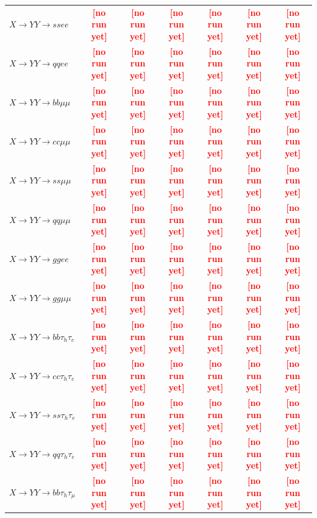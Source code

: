 \documentclass[12pt]{article}   %
\newcommand{\pending}[1]{\textcolor{red}{\textbf{[#1]}}}
\begin{document}
\begin{landscape}
{\begin{longtable}{@{\extracolsep{\fill}}lcccccc@{}}
$X\to YY\to ssee$ & \pending{no run yet} & \pending{no run yet} & \pending{no run yet} & \pending{no run yet} & \pending{no run yet} & \pending{no run yet} \\
$X\to YY\to qqee$ & \pending{no run yet} & \pending{no run yet} & \pending{no run yet} & \pending{no run yet} & \pending{no run yet} & \pending{no run yet} \\
$X\to YY\to bb\mu\mu$ & \pending{no run yet} & \pending{no run yet} & \pending{no run yet} & \pending{no run yet} & \pending{no run yet} & \pending{no run yet} \\
$X\to YY\to cc\mu\mu$ & \pending{no run yet} & \pending{no run yet} & \pending{no run yet} & \pending{no run yet} & \pending{no run yet} & \pending{no run yet} \\
$X\to YY\to ss\mu\mu$ & \pending{no run yet} & \pending{no run yet} & \pending{no run yet} & \pending{no run yet} & \pending{no run yet} & \pending{no run yet} \\
$X\to YY\to qq\mu\mu$ & \pending{no run yet} & \pending{no run yet} & \pending{no run yet} & \pending{no run yet} & \pending{no run yet} & \pending{no run yet} \\
$X\to YY\to ggee$ & \pending{no run yet} & \pending{no run yet} & \pending{no run yet} & \pending{no run yet} & \pending{no run yet} & \pending{no run yet} \\
$X\to YY\to gg\mu\mu$ & \pending{no run yet} & \pending{no run yet} & \pending{no run yet} & \pending{no run yet} & \pending{no run yet} & \pending{no run yet} \\
\midrule
$X\to YY\to bb\tau_h\tau_e$ & \pending{no run yet} & \pending{no run yet} & \pending{no run yet} & \pending{no run yet} & \pending{no run yet} & \pending{no run yet} \\
$X\to YY\to cc\tau_h\tau_e$ & \pending{no run yet} & \pending{no run yet} & \pending{no run yet} & \pending{no run yet} & \pending{no run yet} & \pending{no run yet} \\
$X\to YY\to ss\tau_h\tau_e$ & \pending{no run yet} & \pending{no run yet} & \pending{no run yet} & \pending{no run yet} & \pending{no run yet} & \pending{no run yet} \\
$X\to YY\to qq\tau_h\tau_e$ & \pending{no run yet} & \pending{no run yet} & \pending{no run yet} & \pending{no run yet} & \pending{no run yet} & \pending{no run yet} \\
$X\to YY\to bb\tau_h\tau_\mu$ & \pending{no run yet} & \pending{no run yet} & \pending{no run yet} & \pending{no run yet} & \pending{no run yet} & \pending{no run yet} \\

\end{longtable}}
\end{landscape}
\end{document}

